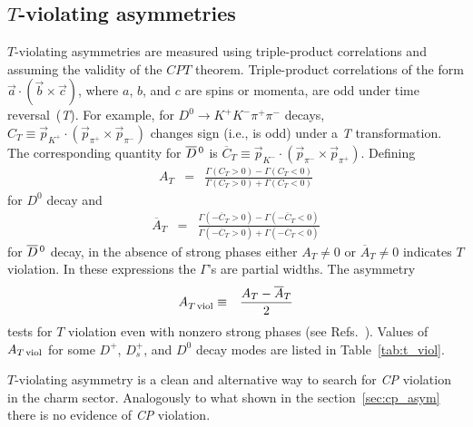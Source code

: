 \subsection{\emph{$T$}-violating asymmetries}
                                               
$T$-violating asymmetries are measured using triple-product
correlations and assuming the validity of the $CPT$ theorem.
Triple-product correlations of the form 
$\vec{a}\cdot(\vec{b}\times\vec{c})$, 
where $a$, $b$, and $c$ are spins or momenta, are odd 
under time reversal~(\emph{T}).
For example, for $D^0 \to K^+K^-\pi^+\pi^-$ decays, 
$C_T \equiv \vec{p}^{}_{K^+}\cdot(\vec{p}_{\pi^+}\times \vec{p}_{\pi^-})$  
changes sign (i.e., is odd) under a \emph{T} transformation.
The corresponding quantity for $\overline{D}{}^{\,0}$ is
$\overline{C}_T \equiv 
      \vec{p}^{}_{K^-}\cdot(\vec{p}_{\pi^-}\times \vec{p}_{\pi^+})$.
Defining  
\begin{eqnarray}
 A_{T} & = &
    \frac{\Gamma(C_T>0)-\Gamma(C_T<0)}{\Gamma(C_T>0)+\Gamma(C_T<0)}
\end{eqnarray}
for $D^0$ decay and
\begin{eqnarray}
\overline{A}_{T} & = & 
   \frac{\Gamma(-\overline{C}_T>0)-\Gamma(-\overline{C}_T<0)}
                        {\Gamma(-\overline{C}_T>0)+\Gamma(-\overline{C}_T<0)}
\end{eqnarray} 
for $\overline{D}{}^{\,0}$ decay, in the absence of strong phases
either $A^{}_T\neq 0$ or $\overline{A}^{}_T\neq 0$ indicates
$T$ violation. In these expressions the $\Gamma$'s are partial widths. 
The asymmetry
\begin{eqnarray}
A^{}_{T\,{\rm viol}} & \equiv & \frac{A_{T}-\overline{A}_{T}}{2}
\end{eqnarray}
tests for $T$ violation even with nonzero strong phases (see 
Refs.~\cite{Golowich:1988ig,Bigi:2001sg,Bensalem:2002ys,Bensalem:2000hq,Bensalem:2002pz}).
Values of $A_{T\,{\rm viol}}$ for some $D^+$, $D^+_s$, and
$D^0$ decay modes are listed in Table~\ref{tab:t_viol}.

$T$-violating asymmetry is a clean and alternative way to search for \emph{CP} violation
in the charm sector. Analogously to what shown in the section~\ref{sec:cp_asym} 
there is no evidence of \emph{CP} violation. 


